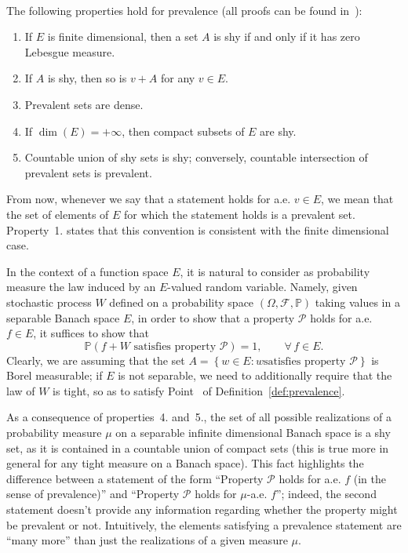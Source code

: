 \documentclass[11pt,oneside,reqno]{amsart}
\newcommand{\tmtextit}[1]{\text{{\itshape{#1}}}}
\newenvironment{enumeratenumeric}{\begin{enumerate}[1.] }{\end{enumerate}}
\numberwithin{equation}{section}
\begin{document}
\

The following properties hold for prevalence (all proofs can be found
in~{\cite{huntsauer}}):
\begin{enumeratenumeric}
  \item If $E$ is finite dimensional, then a set $A$ is shy if and only if it
  has zero Lebesgue measure.
  
  \item If $A$ is shy, then so is $v + A$ for any $v \in E$.
  
  \item Prevalent sets are dense.
  
  \item If $\dim (E) = + \infty$, then compact subsets of $E$ are shy.
  
  \item Countable union of shy sets is shy; conversely, countable intersection
  of prevalent sets is prevalent. 
\end{enumeratenumeric}
From now, whenever we say that a statement holds for a.e. $v \in E$, we mean
that the set of elements of $E$ for which the statement holds is a prevalent
set. Property~1. states that this convention is consistent with the finite
dimensional case.

In the context of a function space $E$, it is natural to consider as
probability measure the law induced by an $E$\mbox{-}valued random variable.
Namely, given stochastic process $W$ defined on a probability space $(\Omega,
\mathcal{F}, \mathbb{P})$ taking values in a separable Banach space $E$, in
order to show that a property $\mathcal{P}$ holds for a.e. $f \in E$, it
suffices to show that
\begin{equation}
  \mathbb{P} \left( \text{$f + W$ satisfies property $\mathcal{P}$} \right) =
  1, \qquad \forall \, f \in E. \label{eq:key-prevalence}
\end{equation}
Clearly, we are assuming that the set $A = \left\{ w \in E : \text{$w$
satisfies property $\mathcal{P}$} \right\}$ is Borel measurable; if $E$ is not
separable, we need to additionally require that the law of $W$ is tight, so as
to satisfy Point~\tmtextit{i.} of Definition~\ref{def:prevalence}.

As a consequence of properties~4. and~5., the set of all possible realizations
of a probability measure $\mu$ on a separable infinite dimensional Banach
space is a shy set, as it is contained in a countable union of compact sets
(this is true more in general for any tight measure on a Banach space). This
fact highlights the difference between a statement of the form ``Property
$\mathcal{P}$ holds for a.e. $f$ (in the sense of prevalence)'' and ``Property
$\mathcal{P}$ holds for $\mu$-a.e. $f$''; indeed, the second statement doesn't
provide any information regarding whether the property might be prevalent or
not. Intuitively, the elements satisfying a prevalence statement are ``many
more'' than just the realizations of a given measure $\mu$.
\end{document}
